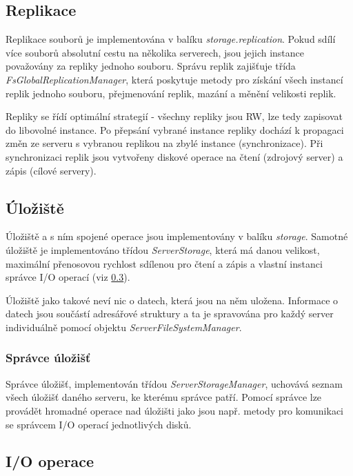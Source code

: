\documentclass[czech,DP]{thesiskiv}
\begin{document}
\subsection{Replikace}

Replikace souborů je implementována v balíku \textit{storage.replication}. Pokud sdílí více souborů absolutní cestu na několika serverech, jsou jejich instance považovány za repliky jednoho souboru. Správu replik zajišťuje třída \textit{FsGlobalReplicationManager}, která poskytuje metody pro získání všech instancí replik jednoho souboru, přejmenování replik, mazání a měnění velikosti replik.

Repliky se řídí optimální strategií - všechny repliky jsou RW, lze tedy zapisovat do libovolné instance. Po přepsání vybrané instance repliky dochází k propagaci změn ze serveru s vybranou replikou na zbylé instance (synchronizace). Při synchronizaci replik jsou vytvořeny diskové operace na čtení (zdrojový server) a zápis (cílové servery).

\subsection{Úložiště}

Úložiště a s ním spojené operace jsou implementovány v balíku \textit{storage}. Samotné úložiště je implementováno třídou \textit{ServerStorage}, která má danou velikost, maximální přenosovou rychlost sdílenou pro čtení a zápis a vlastní instanci správce I/O operací (viz \ref{ioop}).

Úložiště jako takové neví nic o datech, která jsou na něm uložena. Informace o datech jsou součástí adresářové struktury a ta je spravována pro každý server individuálně pomocí objektu \textit{ServerFileSystemManager}.

\subsubsection*{Správce úložišť}

Správce úložišť, implementován třídou \textit{ServerStorageManager}, uchovává seznam všech úložišť daného serveru, ke kterému správce patří. Pomocí správce lze provádět hromadné operace nad úložišti jako jsou např. metody pro komunikaci se správcem I/O operací jednotlivých disků. 

\subsection{I/O operace} \label{ioop}
\end{document}
